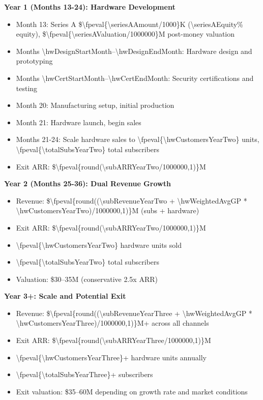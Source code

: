 \documentclass[11pt]{article}
\newcommand{\numfpeval}[1]{\num{\fpeval{#1}}}
\newcommand{\numint}[1]{\num[round-precision=0]{\fpeval{#1}}}
\begin{document}
\textbf{Year 1 (Months 13-24): Hardware Development}
\begin{itemize}
  \item Month 13: Series A \$\numint{\seriesAAmount/1000}K (\num{\seriesAEquity}\% equity), \$\numint{\seriesAValuation/1000000}M post-money valuation
  \item Months \num{\hwDesignStartMonth}--\num{\hwDesignEndMonth}: Hardware design and prototyping
  \item Months \num{\hwCertStartMonth}--\num{\hwCertEndMonth}: Security certifications and testing
  \item Month 20: Manufacturing setup, initial production
  \item Month 21: Hardware launch, begin sales
  \item Months 21-24: Scale hardware sales to \numint{\hwCustomersYearTwo} units, \numint{\totalSubsYearTwo} total subscribers
  \item Exit ARR: \$\numfpeval{round(\subARRYearTwo/1000000,1)}M
\end{itemize}

\textbf{Year 2 (Months 25-36): Dual Revenue Growth}
\begin{itemize}
  \item Revenue: \$\numfpeval{round((\subRevenueYearTwo + \hwWeightedAvgGP * \hwCustomersYearTwo)/1000000,1)}M (subs + hardware)
  \item Exit ARR: \$\numfpeval{round(\subARRYearTwo/1000000,1)}M
  \item \numint{\hwCustomersYearTwo} hardware units sold
  \item \numint{\totalSubsYearTwo} total subscribers
  \item Valuation: \$30--35M (conservative \num{2.5}x ARR)
\end{itemize}

\textbf{Year 3+: Scale and Potential Exit}
\begin{itemize}
  \item Revenue: \$\numfpeval{round((\subRevenueYearThree + \hwWeightedAvgGP * \hwCustomersYearThree)/1000000,1)}M+ across all channels
  \item Exit ARR: \$\numfpeval{round(\subARRYearThree/1000000,1)}M
  \item \numint{\hwCustomersYearThree}+ hardware units annually
  \item \numint{\totalSubsYearThree}+ subscribers
  \item Exit valuation: \$35--60M depending on growth rate and market conditions
\end{itemize}
\end{document}
